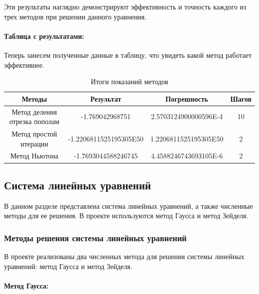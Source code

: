 \documentclass[12pt]{article}
\begin{document}
    Эти результаты наглядно демонстрируют эффективность и точность каждого из трех методов при решении данного уравнения.

    \clearpage

    \paragraph{Таблица с результатами:}
    Теперь занесем полученные данные в таблицу, что увидеть какой метод работает эффективнее.

    \begin{table}[h]
        \centering
        \begin{tabular}{|c|c|c|c|}
            \hline
            \textbf{Методы}               & \textbf{Результат} & \textbf{Погрешность}  & \textbf{Шагов} \\
            \hline
            Метод деления отрезка пополам & -1.769042968751     & 2.5703124900000596E-4 & 10             \\
            \hline
            Метод простой итерации        &-1.2206811525195305E50 &  1.2206811525195305E50  & 2              \\
            \hline
            Метод Ньютона                 & -1.7693044588246745 & 4.4588246743693105E-6 & 2              \\
            \hline
        \end{tabular}
        \caption{Итоги показаний методов}
    \end{table}

    \newpage

    \subsection{Система линейных уравнений}

    В данном разделе представлена система линейных уравнений, а также численные методы для ее решения. В проекте используются метод Гаусса и метод Зейделя.

    \subsubsection{Методы решения системы линейных уравнений}

    В проекте реализованы два численных метода для решения системы линейных уравнений: метод Гаусса и метод Зейделя.

    \paragraph{Метод Гаусса:}
\end{document}
